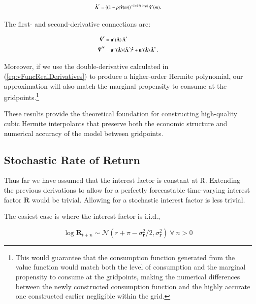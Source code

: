 \documentclass[twocolumn, switch]{article}
\newcommand{\uFunc}{\mathbf{u}}
\newcommand{\CRRA}{\rho}
\newcommand{\Rfree}{\text{R}}
\newcommand{\mNrm}{m}
\newcommand{\vFunc}{\mathbf{v}}
\newcommand{\uPrime}{\uFunc'}
\newcommand{\vInv}{{\scriptsize \boldsymbol{\Lambda}}}
\newcommand{\vInvReal}{\hat{\vInv}}
\newcommand{\vFuncReal}{\hat{\vFunc}}
\newcommand{\vInvRealDeriv}{\vInvReal'}
\newcommand{\vFuncRealDeriv}{\vFuncReal'}
\newcommand{\uDoublePrime}{\uFunc''}
\newcommand{\vFuncRealDerivSecond}{\vFuncReal''}
\newcommand{\vInvRealDerivSecond}{\vInvReal''}
\newcommand{\Risky}{\mathbf{R}}
\newcommand{\Nrml}{\mathcal{N}}
\newcommand{\std}{\sigma}
\newcommand{\risky}{\mathbf{r}}
\newcommand{\equityPrem}{\pi}
\begin{document}
\begin{equation}
\label{eq:vInvRealDeriv}
\vInvRealDeriv = \left( (1-\CRRA) \vFuncReal(\mNrm)\right)^{-1+1/(1-\CRRA)}  \vFuncRealDeriv(\mNrm).
\end{equation}

The first- and second-derivative connections are:

\begin{equation}
\label{eq:vFuncRealDerivatives}
\begin{aligned}
\vFuncRealDeriv &= \uPrime(\vInvReal) \, \vInvRealDeriv \\
\vFuncRealDerivSecond &= \uDoublePrime(\vInvReal) \, (\vInvRealDeriv)^2 + \uPrime(\vInvReal) \, \vInvRealDerivSecond.
\end{aligned}
\end{equation}

Moreover, if we use the double-derivative calculated in (\ref{eq:vFuncRealDerivatives}) to produce a higher-order Hermite polynomial, our approximation will also match the marginal propensity to consume at the gridpoints.\footnote{This would guarantee that the consumption function generated from the value function would match both the level of consumption and the marginal propensity to consume at the gridpoints, making the numerical differences between the newly constructed consumption function and the highly accurate one constructed earlier negligible within the grid.}

These results provide the theoretical foundation for constructing high-quality cubic Hermite interpolants that preserve both the economic structure and numerical accuracy of the model between gridpoints.

\subsection{Stochastic Rate of Return}

Thus far we have assumed that the interest factor is constant at $\Rfree$.
Extending the previous derivations to allow for a perfectly forecastable
time-varying interest factor $\Risky$ would be trivial. Allowing for a
stochastic interest factor is less trivial.

The easiest case is where the interest factor is i.i.d.,

\begin{equation}
\label{eq:distRisky}
\log \Risky_{t+n} \sim \Nrml(r + \equityPrem - \std^{2}_{\risky}/2,\std^{2}_{\risky}) ~\forall~n>0
\end{equation}
\end{document}
